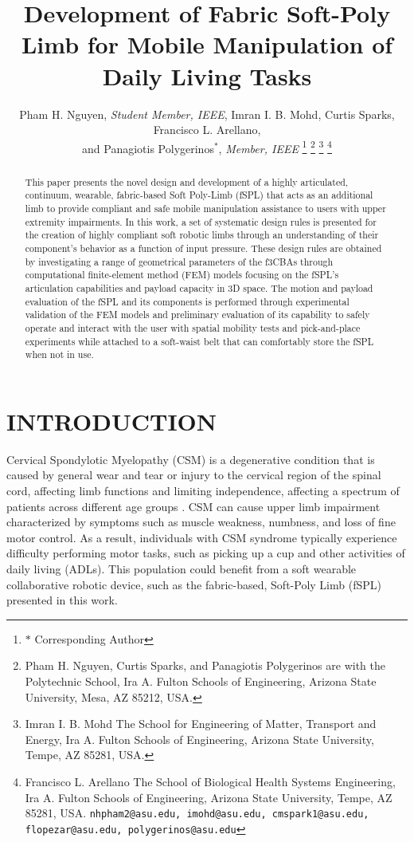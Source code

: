 \documentclass[letterpaper, 10 pt, conference]{ieeeconf}  %
\title{\LARGE \bf
Development of Fabric Soft-Poly Limb for Mobile Manipulation of Daily Living Tasks  
}
\author{Pham H. Nguyen, \textit{Student Member, IEEE}, Imran I. B. Mohd, Curtis Sparks, Francisco L. Arellano,\\ and Panagiotis Polygerinos$^{*}$, \textit{Member, IEEE}%
\thanks{$*$ Corresponding Author}%
\thanks{Pham H. Nguyen, Curtis Sparks, and Panagiotis Polygerinos are with the Polytechnic School, Ira A. Fulton Schools of Engineering, Arizona State University, Mesa, AZ 85212, USA.} 
\thanks{Imran I. B. Mohd The School for Engineering of Matter, Transport and Energy, Ira A. Fulton Schools of Engineering, Arizona State University, Tempe, AZ 85281, USA.}
\thanks{Francisco L. Arellano The School of Biological Health Systems Engineering, Ira A. Fulton Schools of Engineering, Arizona State University, Tempe, AZ 85281, USA.
        {\tt\small nhpham2@asu.edu, imohd@asu.edu, cmspark1@asu.edu, flopezar@asu.edu, polygerinos@asu.edu}}%
}
\begin{document}
\maketitle
\thispagestyle{empty}
\pagestyle{empty}


\begin{abstract}

This paper presents the novel design and development of a highly articulated, continuum, wearable, fabric-based Soft Poly-Limb (fSPL) that acts as an additional limb to provide compliant and safe mobile manipulation assistance to users with upper extremity impairments. In this work, a set of systematic design rules is presented for the creation of highly compliant soft robotic limbs through an understanding of their component’s behavior as a function of input pressure. These design rules are obtained by investigating a range of geometrical parameters of the f3CBAs through computational finite-element method (FEM) models focusing on the fSPL's articulation capabilities and payload capacity in 3D space.  The motion and payload evaluation of the fSPL and its components is performed through experimental validation of the FEM models and preliminary evaluation of its capability to safely operate and interact with the user with spatial mobility tests and pick-and-place experiments while attached to a soft-waist belt that can comfortably store the fSPL when not in use.

\end{abstract}

\section{INTRODUCTION}

Cervical Spondylotic Myelopathy (CSM) is a degenerative condition that is caused by general wear and tear or injury to the cervical region of the spinal cord, affecting limb functions and limiting independence, affecting a spectrum of patients across different age groups \cite{kirby2011,lubelski2016}. CSM can cause upper limb impairment characterized by symptoms such as muscle weakness, numbness, and loss of fine motor control. As a result, individuals with CSM syndrome typically experience difficulty performing motor tasks, such as picking up a cup and other activities of daily living (ADLs). This population could benefit from a soft wearable collaborative robotic device, such as the fabric-based, Soft-Poly Limb (fSPL) presented in this work.
\end{document}
